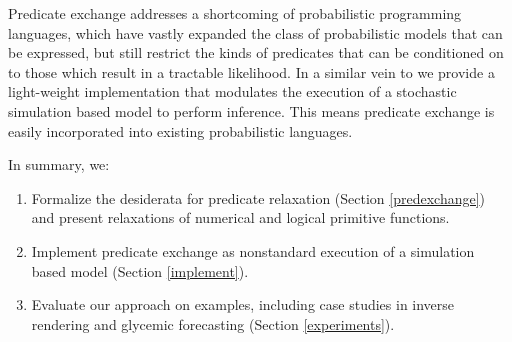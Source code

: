 Predicate exchange addresses a shortcoming of probabilistic programming languages,
which have vastly expanded the class of probabilistic models that can be expressed, but still restrict the kinds of predicates that can be conditioned on to those which result in a tractable likelihood.
In a similar vein to  \cite{wingate2011lightweight} we provide a light-weight implementation that modulates the execution of a stochastic simulation based model to perform inference.
This means predicate exchange is easily incorporated into existing probabilistic languages. 


In summary, we:

\begin{enumerate}
	\item Formalize the desiderata for predicate relaxation (Section \ref{predexchange}) and present relaxations of numerical and logical primitive functions.
	\item Implement predicate exchange as nonstandard execution of a simulation based model (Section \ref{implement}).
	\item Evaluate our approach on examples, including case studies in inverse rendering and glycemic forecasting (Section \ref{experiments}).
\end{enumerate}



